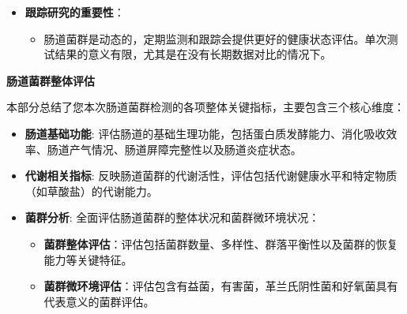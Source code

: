 \documentclass[UTF8]{ctexart}
\begin{document}
\begin{tcolorbox}[
    enhanced,
    colback=lightpurple!10, %
    colframe=white,  %
    arc=3mm,
    boxrule=0.5pt,
    width=\textwidth,
    top=8pt,
    bottom=8pt
]
{\begin{itemize}
\begin{itemize}
        \item 有些微小的变化可能并不具有临床意义，因此请避免对微小差异进行过度解读。务必要将结果视为整体趋势，而非孤立的指标。
    \end{itemize}
    \item \textbf{跟踪研究的重要性}：
    \begin{itemize}
        \item 肠道菌群是动态的，定期监测和跟踪会提供更好的健康状态评估。单次测试结果的意义有限，尤其是在没有长期数据对比的情况下。
    \end{itemize}
\end{itemize}
}
\end{tcolorbox}

\newpage

\begin{tcolorbox}[
    enhanced,
    colback=white,
    colframe=customTeal,
    arc=2mm,
    boxrule=1pt,
    left=20pt,
    right=20pt,
    top=12pt,
    bottom=12pt,
    width=\textwidth,
    fontupper=\sffamily,
    overlay={
    \draw[customTeal, line width=2pt]
    ([xshift=15pt]frame.south west) -- ([xshift=-15pt]frame.south east);
    }
]
{\Large\bfseries\textcolor{customTeal}{\Huge 肠道菌群整体评估}}
\end{tcolorbox}

\begin{tcolorbox}[
    enhanced,
    colback=customTealBg,
    colframe=gray!5,
    arc=3mm,
    boxrule=0pt,
    width=\textwidth,
    top=8pt,
    bottom=8pt
]
{\small{\color{customTeal}\faInfoCircle} 本部分总结了您本次肠道菌群检测的各项整体关键指标，主要包含三个核心维度：
\begin{itemize}
    \item \textbf{肠道基础功能}: 评估肠道的基础生理功能，包括蛋白质发酵能力、消化吸收效率、肠道产气情况、肠道屏障完整性以及肠道炎症状态。

    \item \textbf{代谢相关指标}: 反映肠道菌群的代谢活性，评估包括代谢健康水平和特定物质（如草酸盐）的代谢能力。

    \item \textbf{菌群分析}: 全面评估肠道菌群的整体状况和菌群微环境状况：
    \begin{itemize}
        \item \textbf{菌群整体评估}：评估包括菌群数量、多样性、群落平衡性以及菌群的恢复能力等关键特征。
        \item \textbf{菌群微环境评估}：评估包含有益菌，有害菌，革兰氏阴性菌和好氧菌具有代表意义的菌群评估。
    \end{itemize}
\end{itemize}
}
\end{tcolorbox}
\end{document}
